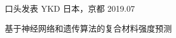 

\begin{cventries}

  \cventry
    {口头发表} %
    {YKD} %
    {日本，京都} %
    {2019.07} %
    {
      \begin{cvitems} %
        \item {基于神经网络和遗传算法的复合材料强度预测}
      \end{cvitems}
    }



\end{cventries}
